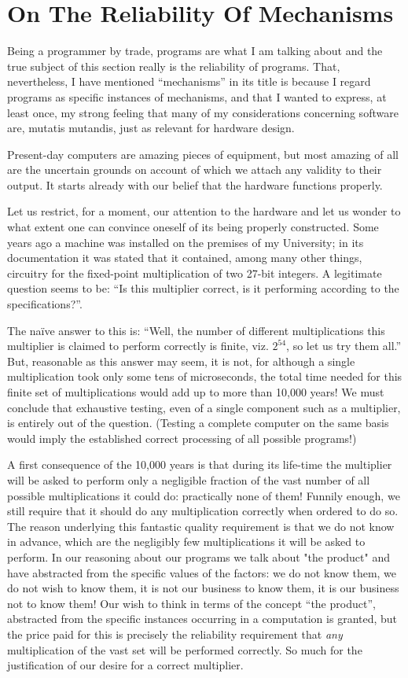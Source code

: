 \section{On The Reliability Of Mechanisms}

Being a programmer by trade, programs are what I am talking about and the true subject of this section really is the reliability of programs. That, nevertheless, I have mentioned ``mechanisms'' in its title is because I regard programs as specific instances of mechanisms, and that I wanted to express, at least once, my strong feeling that many of my considerations concerning software are, mutatis mutandis, just as relevant for hardware design.

Present-day computers are amazing pieces of equipment, but most amazing of all are the uncertain grounds on account of which we attach any validity to their output. It starts already with our belief that the hardware functions properly.

Let us restrict, for a moment, our attention to the hardware and let us wonder to what extent one can convince oneself of its being properly constructed. Some years ago a machine was installed on the premises of my University; in its documentation it was stated that it contained, among many other things, circuitry for the fixed-point multiplication of two 27-bit integers. A legitimate question seems to be: ``Is this multiplier correct, is it performing according to the specifications?''.

The naïve answer to this is: ``Well, the number of different multiplications this multiplier is claimed to perform correctly is finite, viz. $2^{54}$, so let us try them all.'' But, reasonable as this answer may seem, it is not, for although a single multiplication took only some tens of microseconds, the total time needed for this finite set of multiplications would add up to more than 10,000 years! We must conclude that exhaustive testing, even of a single component such as a multiplier, is entirely out of the question. (Testing a complete computer on the same basis would imply the established correct processing of all possible programs!)

A first consequence of the 10,000 years is that during its life-time the multiplier will be asked to perform only a negligible fraction of the vast number of all possible multiplications it could do: practically none of them! Funnily enough, we still require that it should do any multiplication correctly when ordered to do so. The reason underlying this fantastic quality requirement is that we do not know in advance, which are the negligibly few multiplications it will be asked to perform. In our reasoning about our programs we talk about "the product" and have abstracted from the specific values of the factors: we do not know them, we do not wish to know them, it is not our business to know them, it is our business not to know them! Our wish to think in terms of the concept ``the product'', abstracted from the specific instances occurring in a computation is granted, but the price paid for this is precisely the reliability requirement that \textit{any} multiplication of the vast set will be performed correctly. So much for the justification of our desire for a correct multiplier.

